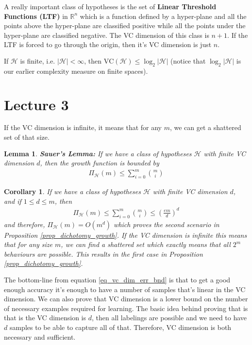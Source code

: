 \documentclass[10pt ]{article}
\newtheorem{corol}{Corollary}
\newtheorem{lem}{Lemma}
\begin{document}
A really important class of hypotheses is the set of \textbf{Linear Threshold Functions (LTF)} in $\mathbb{R}^n$ which is a function defined by a hyper-plane and all the points above the hyper-plane are classified positive while all the points under the hyper-plane are classified negative. The VC dimension of this class is $n+1$. If the LTF is forced to go through the origin, then it's VC dimension is just $n$.

If $\mathcal{H}$ is finite, i.e. $|\mathcal{H}| < \infty$, then $\mathrm{VC}(\mathcal{H}) \le \log_2|\mathcal{H}|$ (notice that $\log_2|\mathcal{H}|$ is our earlier complexity measure on finite spaces).

\section*{Lecture 3}
If the VC dimension is infinite, it means that for any $m$, we can get a shattered set of that size. 
\begin{lem}
{\em
\textbf{Sauer's Lemma:} If we have a class of hypotheses $\mathcal{H}$ with finite VC dimension $d$, then the growth function is bounded by 
\begin{align}
\Pi_{\mathcal{H}}(m) \le \sum_{i=0}^m {m \choose i}
\end{align}
}
\end{lem}
\begin{corol}{\em
If we have a class of hypotheses $\mathcal{H}$ with finite VC dimension $d$, and if $1 \le d \le m$, then 
\begin{align}
\Pi_{\mathcal{H}}(m) \le \sum_{i=0}^m {m \choose i} \le \left( \frac{e m }{d} \right)^d
\end{align}
and therefore, $\Pi_{\mathcal{H}}(m) = O(m^d)$ which proves the second scenario in Proposition \ref{prop_dichotomy_growth}. If the VC dimension is infinite this means that for any size $m$, we can find a shattered set which exactly means that all $2^m$ behaviours are possible. This results in the first case in Proposition \ref{prop_dichotomy_growth}. 

}
\end{corol}

The bottom-line from equation \eqref{eq_vc_dim_err_bnd} is that to get a good enough accuracy it's enough to have a number of samples that's linear in the VC dimension. We can also prove that VC dimension is a lower bound on the number of necessary examples required for learning. The basic idea behind proving that is that is the VC dimension is $d$, then all labelings are possible and we need to have $d$ samples to be able to capture all of that. Therefore, VC dimension is both necessary and sufficient. 
\end{document}
